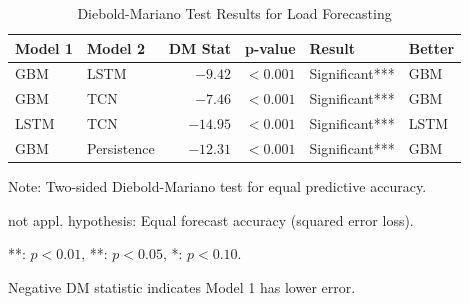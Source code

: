 
\begin{table}[htbp]
\centering
\caption{Diebold-Mariano Test Results for Load Forecasting}
\label{tab:dm_tests}
\begin{tabular}{llrrll}
\toprule
\textbf{Model 1} & \textbf{Model 2} & \textbf{DM Stat} & \textbf{p-value} & \textbf{Result} & \textbf{Better} \\
\midrule
GBM & LSTM & $-9.42$ & $<0.001$ & Significant*** & GBM \\
GBM & TCN & $-7.46$ & $<0.001$ & Significant*** & GBM \\
LSTM & TCN & $-14.95$ & $<0.001$ & Significant*** & LSTM \\
GBM & Persistence & $-12.31$ & $<0.001$ & Significant*** & GBM \\
\bottomrule
\end{tabular}
\begin{tablenotes}
\small
\item Note: Two-sided Diebold-Mariano test for equal predictive accuracy.
\item not appl. hypothesis: Equal forecast accuracy (squared error loss).
\item ***: $p < 0.01$, **: $p < 0.05$, *: $p < 0.10$.
\item Negative DM statistic indicates Model 1 has lower error.
\end{tablenotes}
\end{table}
